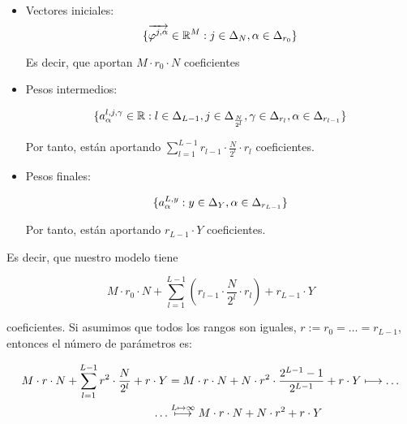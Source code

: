 \begin{itemize}
    \item Vectores iniciales:
        \begin{equation}
            \{\overrightarrow{\varphi^{j, \alpha}} \in \mathbb{R}^M: j \in \Delta_{N}, \alpha \in \Delta_{r_0}  \}
        \end{equation}

        Es decir, que aportan $M \cdot r_0 \cdot N$ coeficientes
    \item Pesos intermedios:

        \begin{equation}
            \{ a^{l, j, \gamma}_{\alpha} \in \mathbb{R}: l \in \Delta_{L-1}, j \in \Delta_{\frac{N}{2^l}}, \gamma \in \Delta_{r_l}, \alpha \in \Delta_{r_{l-1}} \}
        \end{equation}

        Por tanto, están aportando $\sum_{l = 1}^{L-1} r_{l-1} \cdot \frac{N}{2^l} \cdot r_l$ coeficientes.

    \item Pesos finales:

        \begin{equation}
            \{a^{L, y}_{\alpha}: y \in \Delta_{Y}, \alpha \in \Delta_{r_{L-1}} \}
        \end{equation}

        Por tanto, están aportando $r_{L-1} \cdot Y$ coeficientes.
\end{itemize}

Es decir, que nuestro modelo tiene

\begin{equation}
    M \cdot r_0 \cdot N + \sum_{l = 1}^{L-1} (r_{l-1} \cdot \frac{N}{2^l} \cdot r_l ) +
    r_{L-1} \cdot Y
\end{equation}

coeficientes. Si asumimos que todos los rangos son iguales, $r := r_0 = \ldots = r_{L-1}$, entonces el número de parámetros es:

\begin{equation}
\begin{split}
    M \cdot r \cdot N + \sum_{l = 1}^{L-1} r^2 \cdot \frac{N}{2^l} + r \cdot Y &= M \cdot r \cdot N + N \cdot r^2 \cdot \frac{2^{L-1} - 1}{2^{L-1}} + r \cdot Y \longmapsto \ldots \\
    \ldots & \stackrel{L \mapsto \infty}{\longmapsto} M \cdot r \cdot N + N \cdot r^2 + r \cdot Y
\end{split}
\end{equation}

